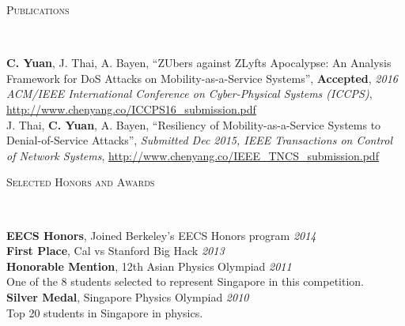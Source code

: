 \documentclass[9pt]{article}
\newenvironment{changemargin}[2]{%
  \begin{list}{}{%
      \setlength{\topsep}{0pt}%
      \setlength{\leftmargin}{#1}%
      \setlength{\rightmargin}{#2}%
      \setlength{\listparindent}{\parindent}%
      \setlength{\itemindent}{\parindent}%
      \setlength{\parsep}{\parskip}%
    }%
  \item[]}{\end{list}
}
\newcommand{\lineover}{
  \begin{changemargin}{-0.05in}{-0.05in}
    \vspace*{-8pt}
    \hrulefill \\
    \vspace*{-2pt}
  \end{changemargin}
}
\newcommand{\header}[1]{
  \begin{changemargin}{-0.5in}{-0.5in}
    \scshape{#1}\\
    \lineover
  \end{changemargin}
}
\newenvironment{body} {
  \vspace*{-16pt}
  \begin{changemargin}{-0.25in}{-0.5in}
  }
  {\end{changemargin}
}
\begin{document}
\smallskip

\header{Publications}
\begin{body}
  \vspace{14pt}
  \textbf{C. Yuan}, J. Thai, A. Bayen, ``ZUbers against ZLyfts Apocalypse: An Analysis
  Framework for DoS Attacks on Mobility-as-a-Service Systems'',
  \textbf{Accepted}, \emph{2016 ACM/IEEE International Conference on Cyber-Physical Systems (ICCPS)}, \url{http://www.chenyang.co/ICCPS16_submission.pdf}\\
  J. Thai, \textbf{C. Yuan}, A. Bayen, ``Resiliency of Mobility-as-a-Service Systems to
  Denial-of-Service Attacks'', \emph{Submitted Dec 2015, IEEE Transactions on
  Control of Network Systems}, \url{http://www.chenyang.co/IEEE_TNCS_submission.pdf} \\
\end{body}
\smallskip

\header{Selected Honors and Awards}
\begin{body}
  \vspace{14pt}
  \textbf{EECS Honors}, Joined Berkeley's EECS Honors program \hfill{} \emph{2014}\\
  \textbf{First Place}, Cal vs Stanford Big Hack \hfill{} \emph{2013}\\
  \textbf{Honorable Mention}, 12th Asian Physics Olympiad \hfill{} \emph{2011}\\
  One of the 8 students selected to represent Singapore in this competition.\\
  \textbf{Silver Medal}, Singapore Physics Olympiad \hfill{} \emph{2010}\\
  Top 20 students in Singapore in physics.
\end{body}
\smallskip
\end{document}
